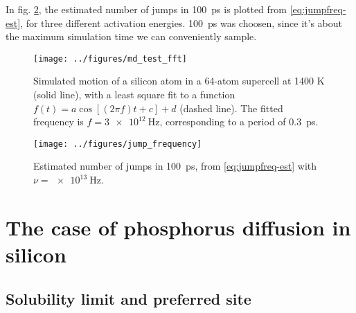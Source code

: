 \documentclass[11pt,bibliography=totoc,index=totoc]{scrbook}   %
\newcommand{\comment}[1]{\hl{#1}}
\begin{document}
In fig. \ref{fig:jumpfreq-est}, the estimated number of jumps in 100~ps is plotted from \eqref{eq:jumpfreq-est},
for three different activation energies. 
100~ps was choosen, since it's about the maximum simulation time we can conveniently sample.

\begin{figure}[htbp]
  \begin{center}
    \texttt{[image: ../figures/md\_test\_fft]}
  \end{center}
  \caption{
    Simulated motion of a silicon atom in a 64-atom supercell at 1400 K (solid line), 
    with a least square fit to a function $f(t) = a \cos[(2\pi f)t + c] + d$ (dashed line). 
    The fitted frequency is $f=\SI{3e12}{\hertz}$, corresponding to a period of 0.3~ps.
  }
  \label{fig:simple-vibration}
\end{figure}

\begin{figure}[htbp]
  \begin{center}
    \texttt{[image: ../figures/jump\_frequency]}
  \end{center}
  \caption{Estimated number of jumps in 100~ps, from \eqref{eq:jumpfreq-est} with $\nu=\SI{e13}{\hertz}$.}
  \label{fig:jumpfreq-est}
\end{figure}



%
\section{The case of phosphorus diffusion in silicon}\label{sec:P}
%

%
\subsection{Solubility limit and preferred site}\label{sec:PSolubility}
%
\end{document}
